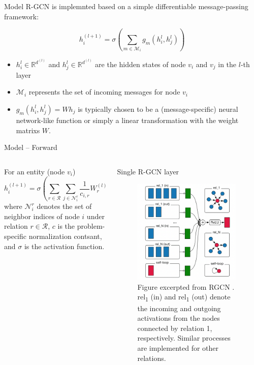 \documentclass[aspectratio=1610,xcolor={dvipsnames},hyperref={colorlinks,unicode,linkcolor=violet,anchorcolor=blueviolet,citecolor=YellowOrange,filecolor=black,urlcolor=Aquamarine}]{beamer}
\begin{document}
\begin{frame}[label={sec:org68f928b}]{Model}
R-GCN is implemnted based on a simple differentiable message-passing
framework:

\[h_{i}^{(l+1)} = \sigma (\sum_{m \in \mathcal{M}_i}g_m(h_i^{l},
h_j^{l}))\]

\begin{itemize}
\item \(h_{i}^{l} \in \mathbb{R}^{d^{(l)}}\) and \(h_{j}^{l} \in
  \mathbb{R}^{d^{(l)}}\) are the hidden states of node \(v_i\) and \(v_j\)
in the \(l\)-th layer
\item \(\mathcal{M}_i\) represents the set of incoming messages for node \(v_i\)
\item \(g_m(h_i^{l}, h_j^{l}) = Wh_j\) is typically chosen to be a
(message-specific) neural network-like function or simply a linear
transformation with the weight matrixs \(W\).
\end{itemize}
\end{frame}

\begin{frame}[label={sec:org2697f82}]{Model -- Forward}
\begin{columns}
\begin{column}{0.4\columnwidth}
\begin{block}{For an entity (node \(v_{i}\))}
\[
h_{i}^{(l+1)}=\sigma\left(\sum_{r \in
\mathcal{R}} \sum_{j \in \mathcal{N}_{i}^{r}} \frac{1}{c_{i, r}}
W_{r}^{(l)} h_{j}^{(l)}+W_{0}^{(l)} h_{i}^{(l)}\right)
\]
where
\(\mathcal{N}_i^r\) denotes the set of neighbor indices of node \(i\)
under relation \(r \in \mathcal{R}\),
\(c\) is the problem-specific normalization contsant,
and \(\sigma\) is the activation function.
\end{block}
\end{column}

\begin{column}{0.5\columnwidth}
\begin{block}{Single R-GCN layer}
\begin{figure}[htbp]
\centering
\includegraphics[height=5cm]{./p2.png}
\caption{\tiny Figure excerpted from RGCN .  rel\textsubscript{1} (in) and rel\textsubscript{1} (out) denote the incoming and outgoing activations from the nodes connected by relation 1, respectively. Similar processes are implemented for other relations.}
\end{figure}
\end{block}
\end{column}
\end{columns}
\end{frame}
\end{document}
